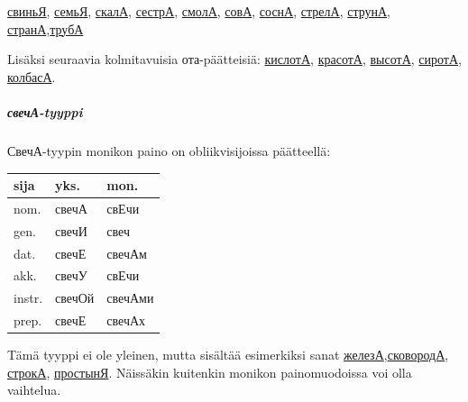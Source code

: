 \documentclass[]{scrreprt}
\begin{document}
\href{http://ru.wiktionary.org/wiki/\%D1\%81\%D0\%B2\%D0\%B8\%D0\%BD\%D1\%8C\%D1\%8F}{свиньЯ},
\href{http://ru.wiktionary.org/wiki/\%D1\%81\%D0\%B5\%D0\%BC\%D1\%8C\%D1\%8F}{семьЯ},
\href{http://ru.wiktionary.org/wiki/\%D1\%81\%D0\%BA\%D0\%B0\%D0\%BB\%D0\%B0}{скалА},
\href{http://ru.wiktionary.org/wiki/\%D1\%81\%D0\%B5\%D1\%81\%D1\%82\%D1\%80\%D0\%B0}{сестрА},
\href{http://ru.wiktionary.org/wiki/\%D1\%81\%D0\%BC\%D0\%BE\%D0\%BB\%D0\%B0}{смолА},
\href{http://ru.wiktionary.org/wiki/\%D1\%81\%D0\%BE\%D0\%B2\%D0\%B0}{совА},
\href{http://ru.wiktionary.org/wiki/\%D1\%81\%D0\%BE\%D1\%81\%D0\%BD\%D0\%B0}{соснА},
\href{http://ru.wiktionary.org/wiki/\%D1\%81\%D1\%82\%D1\%80\%D0\%B5\%D0\%BB\%D0\%B0}{стрелА},
\href{http://ru.wiktionary.org/wiki/\%D1\%81\%D1\%82\%D1\%80\%D1\%83\%D0\%BD\%D0\%B0}{струнА},
\href{http://ru.wiktionary.org/wiki/\%D1\%81\%D1\%82\%D1\%80\%D0\%B0\%D0\%BD\%D0\%B0}{странА},\href{http://ru.wiktionary.org/wiki/\%D1\%82\%D1\%80\%D1\%83\%D0\%B1\%D0\%B0}{трубА}

Lisäksi seuraavia kolmitavuisia ота-päätteisiä:
\href{http://ru.wiktionary.org/wiki/\%D0\%BA\%D0\%B8\%D1\%81\%D0\%BB\%D0\%BE\%D1\%82\%D0\%B0}{кислотА},
\href{http://ru.wiktionary.org/wiki/\%D0\%BA\%D1\%80\%D0\%B0\%D1\%81\%D0\%BE\%D1\%82\%D0\%B0}{красотА},
\href{http://ru.wiktionary.org/wiki/\%D0\%B2\%D1\%8B\%D1\%81\%D0\%BE\%D1\%82\%D0\%B0}{высотА},
\href{http://ru.wiktionary.org/wiki/\%D1\%81\%D0\%B8\%D1\%80\%D0\%BE\%D1\%82\%D0\%B0}{сиротА},
\href{http://ru.wiktionary.org/wiki/\%D0\%BA\%D0\%BE\%D0\%BB\%D0\%B1\%D0\%B0\%D1\%81\%D0\%B0}{колбасА}.

\subparagraph{свечА-tyyppi}\label{ux441ux432ux435ux447ux430-tyyppi}

СвечА-tyypin monikon paino on obliikvisijoissa päätteellä:

\begin{longtable}[c]{@{}lll@{}}
\toprule
sija & yks. & mon.\tabularnewline
\midrule
\endhead
nom. & свечА & свЕчи\tabularnewline
gen. & свечИ & свеч\tabularnewline
dat. & свечЕ & свечАм\tabularnewline
akk. & свечУ & свЕчи\tabularnewline
instr. & свечОй & свечАми\tabularnewline
prep. & свечЕ & свечАх\tabularnewline
\bottomrule
\end{longtable}

Tämä tyyppi ei ole yleinen, mutta sisältää esimerkiksi sanat
\href{http://ru.wiktionary.org/wiki/\%D0\%B6\%D0\%B5\%D0\%BB\%D0\%B5\%D0\%B7\%D0\%B0}{железА},\href{http://ru.wiktionary.org/wiki/\%D1\%81\%D0\%BA\%D0\%BE\%D0\%B2\%D0\%BE\%D1\%80\%D0\%BE\%D0\%B4\%D0\%B0}{сковородА},
\href{http://ru.wiktionary.org/wiki/\%D1\%81\%D1\%82\%D1\%80\%D0\%BE\%D0\%BA\%D0\%B0}{строкА},
\href{http://ru.wiktionary.org/wiki/\%D0\%BF\%D1\%80\%D0\%BE\%D1\%81\%D1\%82\%D1\%8B\%D0\%BD\%D1\%8F}{простынЯ}.
Näissäkin kuitenkin monikon painomuodoissa voi olla vaihtelua.
\end{document}
